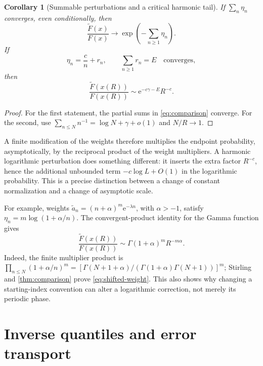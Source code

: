 \documentclass[11pt,a4paper]{article}
\numberwithin{equation}{section}
\newtheorem{corollary}[theorem]{Corollary}
\theoremstyle{definition}
\newcommand{\ee}{\mathrm e}
\begin{document}
\begin{corollary}[Summable perturbations and a critical harmonic tail]
\label{cor:comparison-examples}
If $\sum_n\eta_n$ converges, even conditionally, then
\begin{equation}
 \frac{\widetilde F(x)}{F(x)}\longrightarrow
 \exp\left(-\sum_{n\geq1}\eta_n\right).
 \label{eq:summable-comparison}
\end{equation}
If
\begin{equation}
 \eta_n=\frac c n+r_n,\qquad \sum_{n\geq1}r_n=E\quad\text{converges},
 \label{eq:harmonic-eta}
\end{equation}
then
\begin{equation}
 \frac{\widetilde F(x(R))}{F(x(R))}
 \sim\ee^{-c\gamma-E}R^{-c}.
 \label{eq:harmonic-comparison}
\end{equation}
\end{corollary}

\begin{proof}
For the first statement, the partial sums in \eqref{eq:comparison} converge. For the second, use
$\sum_{n\leq N}n^{-1}=\log N+\gamma+o(1)$ and $N/R\to1$.
\end{proof}

A finite modification of the weights therefore multiplies the endpoint probability, asymptotically, by the reciprocal product of the weight multipliers. A harmonic logarithmic perturbation does something different: it inserts the extra factor $R^{-c}$, hence the additional unbounded term $-c\log L+O(1)$ in the logarithmic probability. This is a precise distinction between a change of constant normalization and a change of asymptotic scale.

For example, weights
$\widetilde a_n=(n+\alpha)^m\ee^{-\lambda n}$, with $\alpha>-1$, satisfy
$\eta_n=m\log(1+\alpha/n)$. The convergent-product identity for the Gamma function gives
\begin{equation}
 \frac{\widetilde F(x(R))}{F(x(R))}
 \sim\Gamma(1+\alpha)^m R^{-m\alpha}.
 \label{eq:shifted-weight}
\end{equation}
Indeed, the finite multiplier product is
$\prod_{n\leq N}(1+\alpha/n)^m
 =[\Gamma(N+1+\alpha)/(\Gamma(1+\alpha)\Gamma(N+1))]^m$;
Stirling and \cref{thm:comparison} prove \eqref{eq:shifted-weight}. This also shows why changing a starting-index convention can alter a logarithmic correction, not merely its periodic phase.

\section{Inverse quantiles and error transport}
\label{sec:quantiles}
\end{document}
